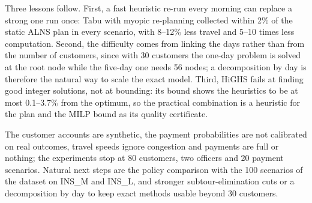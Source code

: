 \documentclass[11pt,a4paper]{article}
\begin{document}
Three lessons follow. First, a fast heuristic re-run every morning can
replace a strong one run once: Tabu with myopic re-planning collected within
2\% of the static ALNS plan in every scenario, with 8--12\% less travel and
5--10 times less computation. Second, the difficulty comes from linking the
days rather than from the number of customers, since with 30 customers the
one-day problem is solved at the root node while the five-day one needs 56
nodes; a decomposition by day is therefore the natural way to scale the
exact model. Third, HiGHS fails at finding good integer solutions, not at
bounding: its bound shows the heuristics to be at most 0.1--3.7\% from the
optimum,
so the practical combination is a heuristic for the plan and the MILP bound
as its quality certificate.

The customer accounts are synthetic, the payment probabilities are not
calibrated on real outcomes, travel speeds ignore congestion and payments
are full or nothing; the experiments stop at 80 customers, two officers and
20 payment scenarios. Natural next steps are the policy comparison with the
100 scenarios of the dataset on INS\_M and INS\_L, and stronger
subtour-elimination cuts or a decomposition by day to keep exact methods
usable beyond 30 customers.

\end{document}
